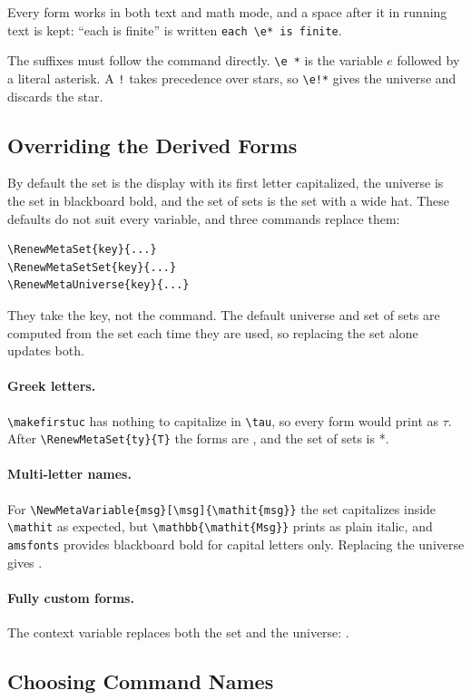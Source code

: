 \documentclass{article}
\begin{document}
Every form works in both text and math mode, and a space after it in
running text is kept: ``each \e* is finite'' is written
\verb|each \e* is finite|.

The suffixes must follow the command directly. \verb|\e *| is the
variable $e$ followed by a literal asterisk. A \verb|!| takes precedence
over stars, so \verb|\e!*| gives the universe and discards the star.

\subsection{Overriding the Derived Forms}

By default the set is the display with its first letter capitalized, the
universe is the set in blackboard bold, and the set of sets is the set
with a wide hat. These defaults do not suit every variable, and three
commands replace them:
\begin{verbatim}
\RenewMetaSet{key}{...}
\RenewMetaSetSet{key}{...}
\RenewMetaUniverse{key}{...}
\end{verbatim}
They take the key, not the command. The default universe and set of
sets are computed from the set each time they are used, so replacing
the set alone updates both.

\paragraph{Greek letters.} \verb|\makefirstuc| has nothing to capitalize
in \verb|\tau|, so every form would print as $\tau$. After
\verb|\RenewMetaSet{ty}{T}| the forms are \showcasex{\ty}, and the set
of sets is \ty**.

\paragraph{Multi-letter names.} For \verb|\NewMetaVariable{msg}[\msg]{\mathit{msg}}|
the set capitalizes inside \verb|\mathit| as expected, but
\verb|\mathbb{\mathit{Msg}}| prints as plain italic, and
\texttt{amsfonts} provides blackboard bold for capital letters only.
Replacing the universe gives \showcasex{\msg}.

\paragraph{Fully custom forms.} The context variable replaces both the
set and the universe: \showcasex{\ctx}.

\subsection{Choosing Command Names}
\end{document}
